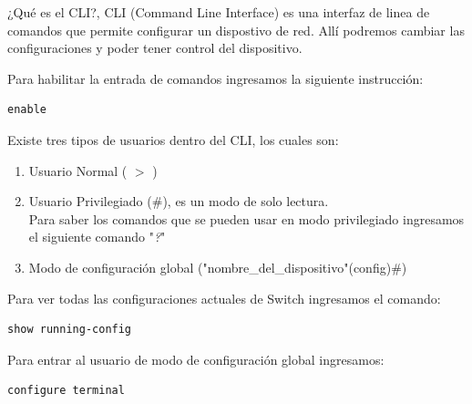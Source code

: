 \documentclass[journal]{IEEEtran}
\begin{document}
¿Qué es el CLI?, CLI (Command Line Interface) es una interfaz de linea de comandos que permite configurar un dispostivo de red. Allí podremos cambiar las configuraciones y poder tener control del dispositivo.

Para habilitar la entrada de comandos ingresamos la siguiente instrucción:
\begin{lstlisting}[frame=single]
enable	
\end{lstlisting}

Existe tres tipos de usuarios dentro del CLI, los cuales son:
\begin{enumerate}
	\item Usuario Normal ( $>$ )
	\item Usuario Privilegiado ($\#$), es un modo de solo lectura. \\
	Para saber los comandos que se pueden usar en modo privilegiado ingresamos el siguiente comando "\textit{?}"
	\item Modo de configuración global ("nombre\_del\_dispositivo"(config)$\#$)
\end{enumerate}

Para ver todas las configuraciones actuales de Switch ingresamos el comando:
\begin{lstlisting}[frame=single]
	show running-config
\end{lstlisting}

Para entrar al usuario de modo de configuración global ingresamos:
\begin{lstlisting}[frame=single]
	configure terminal
\end{lstlisting}
\end{document}
